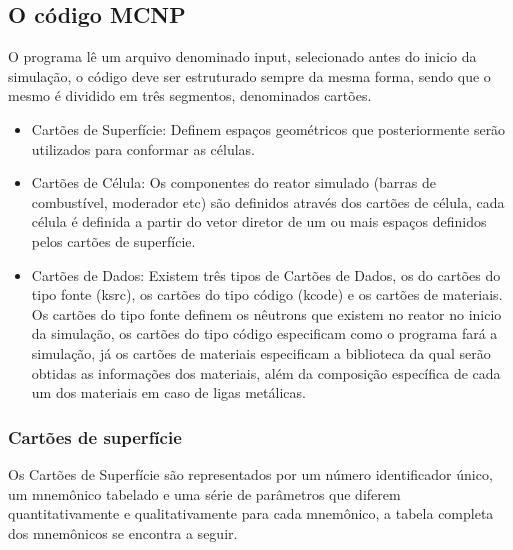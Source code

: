 \documentclass[
	12pt,				%
	openany,			%
	twoside,			%
	a4paper,			%
	english,			%
	french,				%
	spanish,			%
	brazil				%
	]{abntex2}
\begin{document}
\subsection{O código MCNP}

O programa lê um arquivo denominado input, selecionado antes do inicio da simulação, o código deve ser estruturado sempre da mesma forma, sendo que o mesmo é dividido em três segmentos, denominados cartões\cite{8MCNP}.
\begin{itemize}
\item Cartões de Superfície: Definem espaços geométricos que posteriormente serão utilizados para conformar as células. 
\item Cartões de Célula: Os componentes do reator simulado (barras de combustível, moderador etc) são definidos através dos cartões de célula, cada célula é definida a partir do vetor diretor de um ou mais espaços definidos pelos cartões de superfície. 
\item Cartões de Dados: Existem três tipos de Cartões de Dados, os do cartões do tipo fonte (ksrc), os cartões do tipo código (kcode) e os cartões de materiais. Os cartões do tipo fonte definem os nêutrons que existem no reator no inicio da simulação, os cartões do tipo código especificam como o programa fará a simulação, já os cartões de materiais especificam a biblioteca da qual serão obtidas as informações dos materiais, além da composição específica de cada um dos materiais em caso de ligas metálicas.
\end{itemize}

\subsubsection*{Cartões de superfície }

Os Cartões de Superfície são representados por um número identificador
único, um mnemônico tabelado e uma série de parâmetros que diferem
quantitativamente e qualitativamente para cada mnemônico, a tabela
completa dos mnemônicos se encontra a seguir.
\end{document}
